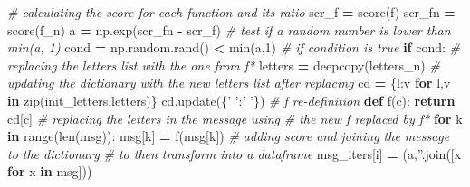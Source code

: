 \documentclass[]{article}
\newenvironment{Shaded}{\begin{snugshade}}{\end{snugshade}}
\newcommand{\BuiltInTok}[1]{#1}
\newcommand{\CommentTok}[1]{\textcolor[rgb]{0.56,0.35,0.01}{\textit{#1}}}
\newcommand{\ControlFlowTok}[1]{\textcolor[rgb]{0.13,0.29,0.53}{\textbf{#1}}}
\newcommand{\DecValTok}[1]{\textcolor[rgb]{0.00,0.00,0.81}{#1}}
\newcommand{\KeywordTok}[1]{\textcolor[rgb]{0.13,0.29,0.53}{\textbf{#1}}}
\newcommand{\NormalTok}[1]{#1}
\newcommand{\OperatorTok}[1]{\textcolor[rgb]{0.81,0.36,0.00}{\textbf{#1}}}
\newcommand{\StringTok}[1]{\textcolor[rgb]{0.31,0.60,0.02}{#1}}
\begin{document}
\begin{Shaded}
\begin{Highlighting}[]
        \CommentTok{# calculating the score for each function and its ratio}
\NormalTok{        scr_f }\OperatorTok{=}\NormalTok{ score(f)}
\NormalTok{        scr_fn }\OperatorTok{=}\NormalTok{ score(f_n)}
\NormalTok{        a }\OperatorTok{=}\NormalTok{ np.exp(scr_fn }\OperatorTok{-}\NormalTok{ scr_f)}
        \CommentTok{# test if a random number is lower than min(a, 1)}
\NormalTok{        cond }\OperatorTok{=}\NormalTok{ np.random.rand() }\OperatorTok{<} \BuiltInTok{min}\NormalTok{(a,}\DecValTok{1}\NormalTok{)}
        \CommentTok{# if condition is true}
        \ControlFlowTok{if}\NormalTok{ cond:}
            \CommentTok{# replacing the letters list with the one from f*}
\NormalTok{            letters }\OperatorTok{=}\NormalTok{ deepcopy(letters_n)}
            \CommentTok{# updating the dictionary with the new letters list after replacing}
\NormalTok{            cd }\OperatorTok{=}\NormalTok{ \{l:v }\ControlFlowTok{for}\NormalTok{ l,v }\KeywordTok{in} \BuiltInTok{zip}\NormalTok{(init_letters,letters)\}}
\NormalTok{            cd.update(\{}\StringTok{' '}\NormalTok{:}\StringTok{' '}\NormalTok{\})}
            \CommentTok{# f re-definition}
            \KeywordTok{def}\NormalTok{ f(c):}
                \ControlFlowTok{return}\NormalTok{ cd[c]}
            \CommentTok{# replacing the letters in the message using }
            \CommentTok{# the new f replaced by f*}
            \ControlFlowTok{for}\NormalTok{ k }\KeywordTok{in} \BuiltInTok{range}\NormalTok{(}\BuiltInTok{len}\NormalTok{(msg)):}
\NormalTok{                msg[k] }\OperatorTok{=}\NormalTok{ f(msg[k])}
            \CommentTok{# adding score and joining the message to the dictionary}
            \CommentTok{# to then transform into a dataframe}
\NormalTok{            msg_iters[i] }\OperatorTok{=}\NormalTok{ (a,}\StringTok{''}\NormalTok{.join([x }\ControlFlowTok{for}\NormalTok{ x }\KeywordTok{in}\NormalTok{ msg]))}


\end{Highlighting}
\end{Shaded}
\end{document}
